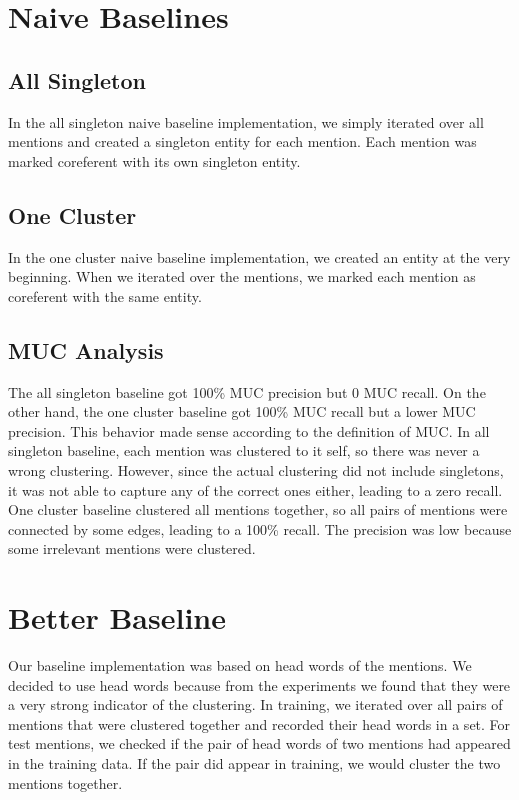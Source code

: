 \documentclass[12pt, twocolumn]{article}
\begin{document}

\section{Naive Baselines}
\subsection{All Singleton}
In the all singleton naive baseline implementation, we simply iterated over all mentions and created a singleton entity for each mention. Each mention was marked coreferent with its own singleton entity.

\subsection{One Cluster}
In the one cluster naive baseline implementation, we created an entity at the very beginning. When we iterated over the mentions, we marked each mention as coreferent with the same entity.

\subsection{MUC Analysis}
The all singleton baseline got 100\% MUC precision but 0 MUC recall. On the other hand, the one cluster baseline got 100\% MUC recall but a lower MUC precision. This behavior made sense according to the definition of MUC. In all singleton baseline, each mention was clustered to it self, so there was never a wrong clustering. However, since the actual clustering did not include singletons, it was not able to capture any of the correct ones either, leading to a zero recall. One cluster baseline clustered all mentions together, so all pairs of mentions were connected by some edges, leading to a 100\% recall. The precision was low because some irrelevant mentions were clustered.

\section{Better Baseline}
Our baseline implementation was based on head words of the mentions. We decided to use head words because from the experiments we found that they were a very strong indicator of the clustering.
 In training, we iterated over all pairs of mentions that were clustered together and recorded their head words in a set. 
For test mentions, we checked if the pair of head words of two mentions had appeared in the training data. If the pair did appear in training, we would cluster the two mentions together.
\end{document}
